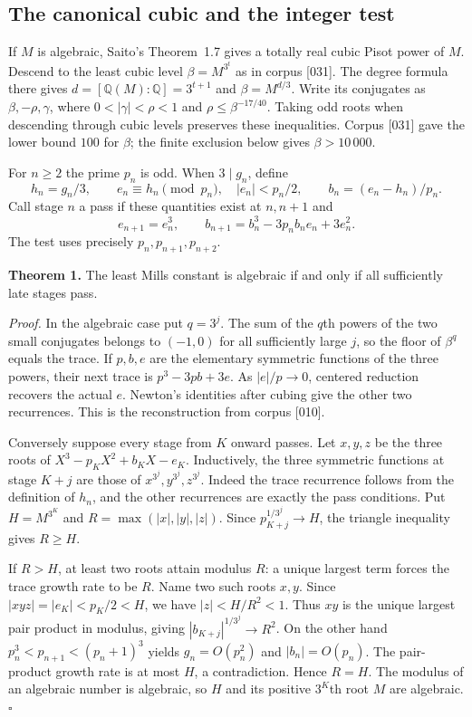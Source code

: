 \documentclass[11pt,a4paper,oneside,openany]{book}
\begin{document}
\subsection*{The canonical cubic and the integer test}
If $M$ is algebraic, Saito's Theorem~1.7 gives a totally real cubic Pisot power of $M$. Descend to the least cubic level $\beta=M^{3^t}$ as in corpus [031]. The degree formula there gives $d=[\mathbb Q(M):\mathbb Q]=3^{t+1}$ and $\beta=M^{d/3}$. Write its conjugates as $\beta,-\rho,\gamma$, where $0<|\gamma|<\rho<1$ and $\rho\le\beta^{-17/40}$. Taking odd roots when descending through cubic levels preserves these inequalities. Corpus [031] gave the lower bound $100$ for $\beta$; the finite exclusion below gives $\beta>10\,000$.

For $n\ge2$ the prime $p_n$ is odd. When $3\mid g_n$, define
\[
 h_n=g_n/3,\qquad e_n\equiv h_n\pmod{p_n},\quad |e_n|<p_n/2,
 \qquad b_n=(e_n-h_n)/p_n.
\]
Call stage $n$ a pass if these quantities exist at $n,n+1$ and
\[
 e_{n+1}=e_n^3,\qquad
 b_{n+1}=b_n^3-3p_nb_ne_n+3e_n^2.
\]
The test uses precisely $p_n,p_{n+1},p_{n+2}$.

\textbf{Theorem 1.} The least Mills constant is algebraic if and only if all sufficiently late stages pass.

\textit{Proof.} In the algebraic case put $q=3^j$. The sum of the $q$th powers of the two small conjugates belongs to $(-1,0)$ for all sufficiently large $j$, so the floor of $\beta^q$ equals the trace. If $p,b,e$ are the elementary symmetric functions of the three powers, their next trace is $p^3-3pb+3e$. As $|e|/p\to0$, centered reduction recovers the actual $e$. Newton's identities after cubing give the other two recurrences. This is the reconstruction from corpus [010].

Conversely suppose every stage from $K$ onward passes. Let $x,y,z$ be the three roots of $X^3-p_KX^2+b_KX-e_K$. Inductively, the three symmetric functions at stage $K+j$ are those of $x^{3^j},y^{3^j},z^{3^j}$. Indeed the trace recurrence follows from the definition of $h_n$, and the other recurrences are exactly the pass conditions. Put $H=M^{3^K}$ and $R=\max(|x|,|y|,|z|)$. Since $p_{K+j}^{1/3^j}\to H$, the triangle inequality gives $R\ge H$.

If $R>H$, at least two roots attain modulus $R$: a unique largest term forces the trace growth rate to be $R$. Name two such roots $x,y$. Since $|xyz|=|e_K|<p_K/2<H$, we have $|z|<H/R^2<1$. Thus $xy$ is the unique largest pair product in modulus, giving $|b_{K+j}|^{1/3^j}\to R^2$. On the other hand $p_n^3<p_{n+1}<(p_n+1)^3$ yields $g_n=O(p_n^2)$ and $|b_n|=O(p_n)$. The pair-product growth rate is at most $H$, a contradiction. Hence $R=H$. The modulus of an algebraic number is algebraic, so $H$ and its positive $3^K$th root $M$ are algebraic.\hfill$\square$
\end{document}
